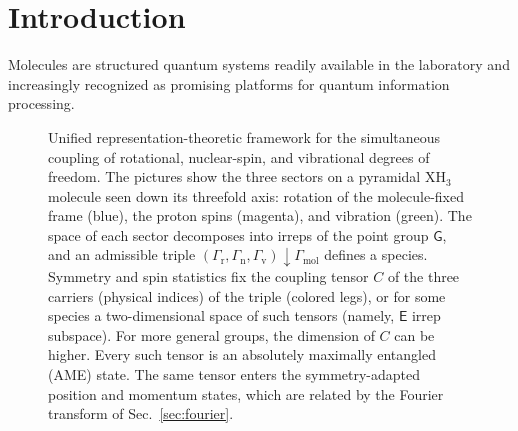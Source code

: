 \documentclass[
  reprint,
  aps,
  prx,
  superscriptaddress,
  amsmath,
  amssymb,
  longbibliography
]{revtex4-2}
\newcommand{\grp}[1]{\mathsf{#1}}
\providecommand{\Gmol}{\Gamma_{\mathrm{mol}}}
\providecommand{\Grot}{\Gamma_{\mathrm{r}}}
\providecommand{\Gvib}{\Gamma_{\mathrm{v}}}
\providecommand{\Gspin}{\Gamma_{\mathrm{n}}}
\begin{document}
\maketitle





\section{Introduction}

Molecules are structured quantum systems readily available in the laboratory and increasingly recognized as promising platforms for quantum information processing.
\begin{figure}[!t]
    \centering
    
    \caption{Unified representation-theoretic framework for the simultaneous coupling of rotational, nuclear-spin, and vibrational degrees of freedom. The pictures show the three sectors on a pyramidal $\mathrm{XH_3}$ molecule seen down its threefold axis: rotation of the molecule-fixed frame (blue), the proton spins (magenta), and vibration (green). The space of each sector decomposes into irreps of the point group $\grp{G}$, and an admissible triple $(\Grot,\Gspin,\Gvib)\downarrow\Gmol$ defines a species. Symmetry and spin statistics fix the coupling tensor $C$ of the three carriers (physical indices) of the triple (colored legs), or for some species a two-dimensional space of such tensors (namely, $\grp{E}$ irrep subspace). For more general groups, the dimension of $C$ can be higher. Every such tensor is an absolutely maximally entangled (AME) state. The same tensor enters the symmetry-adapted position and momentum states, which are related by the Fourier transform of Sec.~\ref{sec:fourier}.}
    \label{fig:phase_space_formalism}
\end{figure}
\end{document}
